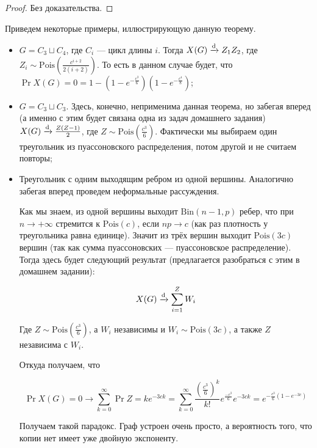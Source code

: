 \begin{proof}
  Без доказательства.
\end{proof}

\begin{example}
  Приведем некоторые примеры, иллюстрирующую данную теорему.

  \begin{itemize}
    \item $G = C_3 \sqcup C_4$, где $C_i$ --- цикл длины $i$.
    Тогда $X(G) \xrightarrow{\mathrm{d}} Z_1Z_2$, где $Z_i \sim
    \mathrm{Pois}\left(\frac{c^{i + 2}}{2(i + 2)}\right)$.
    То есть в данном случае будет, что $\Pr{X(G) = 0} = 
    1 - \left(1 - e^{-\frac{c^3}{6}}\right)\left(1 - e^{-\frac{c^4}{8}}\right)$;
    \item $G = C_3 \sqcup C_3$. Здесь, конечно, неприменима данная теорема,
    но забегая вперед (а именно с этим будет связана одна из задач домашнего
    задания) $X(G) \xrightarrow{\mathrm{d}} \frac{Z(Z - 1)}{2}$, где $Z \sim 
    \mathrm{Pois}\left(\frac{c^{3}}{6}\right)$. Фактически мы выбираем один треугольник
    из пуассоновского распределения, потом другой и не считаем повторы;
    \item Треугольник с одним выходящим ребром из одной вершины. Аналогично забегая
    вперед проведем неформальные рассуждения.

    Как мы знаем, из одной вершины выходит $\mathrm{Bin}(n - 1, p)$ ребер, что
    при $n \to +\infty$ стремится к $\mathrm{Pois}(c)$, если $np \to c$ (как
    раз плотность у треугольника равна единице). Значит из трёх вершин выходит
    $\mathrm{Pois}(3c)$ вершин (так как сумма пуассоновских --- пуассоновское
    распределение). Тогда здесь будет следующий результат (предлагается разобраться
    с этим в домашнем задании):

    \[
      X(G) \xrightarrow{\mathrm{d}} \sum\limits_{i = 1}^{Z} W_i
    \]

    Где $Z \sim \mathrm{Pois}\left(\frac{c^3}{6}\right)$, а $W_i$ независимы и
    $W_i \sim \mathrm{Pois}(3c)$, а также $Z$ независима с $W_i$.

    Откуда получаем, что

    \[
      \Pr{X(G) = 0} \to \sum\limits_{k = 0}^{\infty} \Pr{Z = k}e^{-3ck} = 
      \sum\limits_{k = 0}^{\infty} \frac{\left(\frac{c^{3}}{6}\right)^k}{k!}e^{\frac{-c^3}{6}}e^{-3ck} =
      e^{-\frac{c^3}{6}(1 - e^{-3c})}
    \]

    Получаем такой парадокс. Граф устроен очень просто, а вероятность того, что
    копии нет имеет уже двойную экспоненту.
  \end{itemize}
\end{example}

